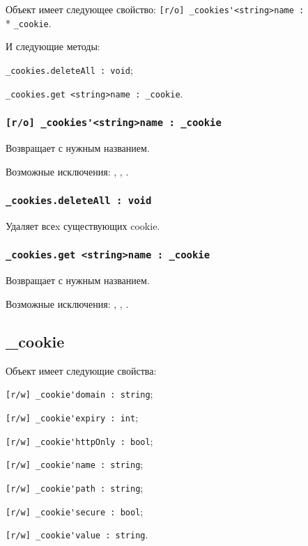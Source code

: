Объект \cookies{} имеет следующее свойство: \lstinline|[r/o] _cookies'<string>name :|\\* \lstinline|_cookie|.

И следующие методы: 
\begin{icItems}
	\item \lstinline|_cookies.deleteAll : void|;
	\item \lstinline|_cookies.get <string>name : _cookie|.
\end{icItems}

\subsubsection{\lstinline|[r/o] _cookies'<string>name : _cookie|}

Возвращает \cookie{} с нужным названием.

Возможные исключения: , , .

\subsubsection{\lstinline|_cookies.deleteAll : void|}

Удаляет всеx существующих cookie.

\subsubsection{\lstinline|_cookies.get <string>name : _cookie|}

Возвращает \cookie{} с нужным названием.

Возможные исключения: , , .

\subsection{{\color{orange} \_cookie}}

Объект \cookie{} имеет следующие свойства:
\begin{icItems}
	\item \lstinline|[r/w] _cookie'domain : string|;
	\item \lstinline|[r/w] _cookie'expiry : int|;
	\item \lstinline|[r/w] _cookie'httpOnly : bool|;
	\item \lstinline|[r/w] _cookie'name : string|;
	\item \lstinline|[r/w] _cookie'path : string|;
	\item \lstinline|[r/w] _cookie'secure : bool|;
	\item \lstinline|[r/w] _cookie'value : string|.
\end{icItems}

